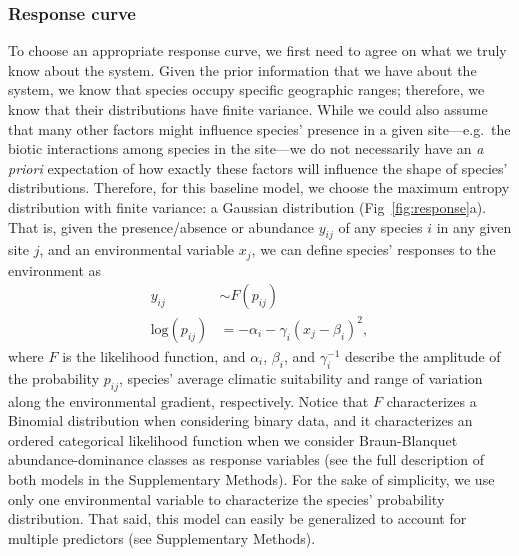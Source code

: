 \documentclass[11pt, a4paper]{article}
\begin{document}
\subsubsection*{Response curve}
To choose an appropriate response curve, we first need to agree on what we truly know about the system. Given the prior information that we have about the system, we know that species occupy specific geographic ranges; therefore, we know that their distributions have finite variance. While we could also assume that many other factors might influence species' presence in a given site---e.g.~the biotic interactions among species in the site---we do not necessarily have an \textit{a priori} expectation of how exactly these factors will influence the shape of species' distributions. Therefore, for this baseline model, we choose the maximum entropy distribution with finite variance: a Gaussian distribution (Fig~\ref{fig:response}a). That is, given the presence/absence or abundance $y_{ij}$ of any species $i$ in any given site $j$, and an environmental variable $x_{j}$, we can define species' responses to the environment as
\begin{equation}
\begin{split}
y_{ij} & \sim F\left(p_{ij}\right) \\
\text{log}\left(p_{ij}\right) & = -\alpha_{i} - \gamma_{i} \left(x_{j}-\beta_{i}\right)^2 ,
\end{split}
\label{eq:baseline-response}
\end{equation}
where $F$ is the likelihood function, and $\alpha_i$, $\beta_i$, and $\gamma^{-1}_i$ describe the amplitude of the probability $p_{ij}$, species' average climatic suitability and range of variation along the environmental gradient, respectively. Notice that $F$ characterizes a Binomial distribution when considering binary data, and it characterizes an ordered categorical likelihood function when we consider Braun-Blanquet abundance-dominance classes as response variables (see the full description of both models in the Supplementary Methods). For the sake of simplicity, we use only one environmental variable to characterize the species' probability distribution. That said, this model can easily be generalized to account for multiple predictors (see Supplementary Methods).
\end{document}
